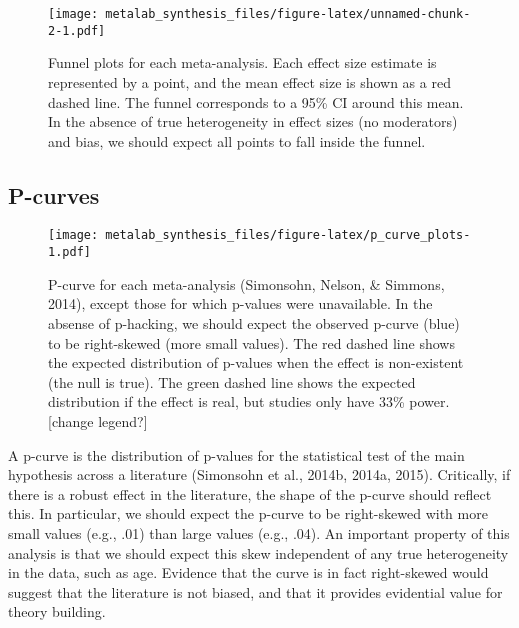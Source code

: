 \documentclass[english,floatsintext,man]{apa6}
\begin{document}
\begin{figure}[htbp]
\centering
\texttt{[image: metalab\_synthesis\_files/figure-latex/unnamed-chunk-2-1.pdf]}
\caption{Funnel plots for each meta-analysis. Each effect size estimate
is represented by a point, and the mean effect size is shown as a red
dashed line. The funnel corresponds to a 95\% CI around this mean. In
the absence of true heterogeneity in effect sizes (no moderators) and
bias, we should expect all points to fall inside the funnel.}
\end{figure}

\subsection{P-curves}\label{p-curves}

\begin{figure}[htbp]
\centering
\texttt{[image: metalab\_synthesis\_files/figure-latex/p\_curve\_plots-1.pdf]}
\caption{P-curve for each meta-analysis (Simonsohn, Nelson, \& Simmons,
2014), except those for which p-values were unavailable. In the absense
of p-hacking, we should expect the observed p-curve (blue) to be
right-skewed (more small values). The red dashed line shows the expected
distribution of p-values when the effect is non-existent (the null is
true). The green dashed line shows the expected distribution if the
effect is real, but studies only have 33\% power. {[}change legend?{]}}
\end{figure}

A p-curve is the distribution of p-values for the statistical test of
the main hypothesis across a literature (Simonsohn et al., 2014b, 2014a,
2015). Critically, if there is a robust effect in the literature, the
shape of the p-curve should reflect this. In particular, we should
expect the p-curve to be right-skewed with more small values (e.g., .01)
than large values (e.g., .04). An important property of this analysis is
that we should expect this skew independent of any true heterogeneity in
the data, such as age. Evidence that the curve is in fact right-skewed
would suggest that the literature is not biased, and that it provides
evidential value for theory building.
\end{document}
